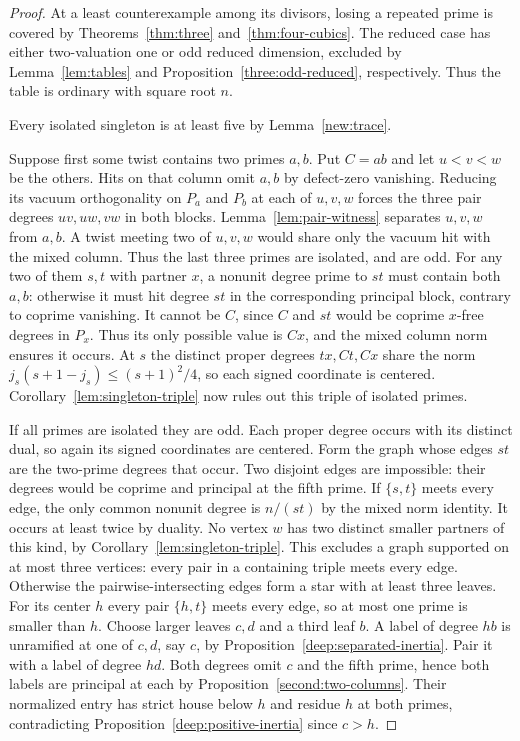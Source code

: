 \documentclass[11pt,a4paper]{article}
\numberwithin{equation}{section}
\theoremstyle{remark}
\begin{document}
\begin{proof}
At a least counterexample among its divisors, losing a repeated prime
is covered by Theorems~\ref{thm:three} and~\ref{thm:four-cubics}.
The reduced case has either two-valuation one or odd reduced
dimension, excluded by Lemma~\ref{lem:tables} and Proposition~\ref{three:odd-reduced}, respectively. Thus the table
is ordinary with square root $n$.

Every isolated singleton is at least five by Lemma~\ref{new:trace}.

Suppose first some twist contains two primes $a,b$. Put $C=ab$
and let $u<v<w$ be the others. Hits on that column omit $a,b$ by
defect-zero vanishing. Reducing its vacuum orthogonality on $P_a$
and $P_b$ at each of $u,v,w$ forces the three pair degrees $uv,uw,vw$
in both blocks. Lemma~\ref{lem:pair-witness} separates $u,v,w$ from
$a,b$. A twist meeting two of $u,v,w$ would share only the vacuum
hit with the mixed column. Thus the last three primes are isolated,
and are odd. For any two of them $s,t$ with partner $x$, a nonunit
degree prime to $st$ must contain both $a,b$: otherwise it must hit
degree $st$ in the corresponding principal block, contrary to coprime
vanishing. It cannot be $C$, since $C$ and $st$ would be coprime
$x$-free degrees in $P_x$. Thus its only possible value is $Cx$,
and the mixed column norm ensures it occurs. At $s$ the distinct proper degrees $tx,Ct,Cx$ share the
norm $j_s(s+1-j_s)\le(s+1)^2/4$, so each signed coordinate is
centered. Corollary~\ref{lem:singleton-triple} now rules out this
triple of isolated primes.

If all primes are isolated they are odd. Each proper degree occurs
with its distinct dual, so again its signed coordinates are centered.
Form the graph whose edges $st$ are the
two-prime degrees that occur. Two disjoint edges are impossible:
their degrees would be coprime and principal at the fifth prime.
If $\{s,t\}$ meets every edge, the only common nonunit degree is
$n/(st)$ by the mixed norm identity. It occurs at least twice by
duality. No vertex $w$ has two distinct smaller partners of this
kind, by Corollary~\ref{lem:singleton-triple}. This excludes a graph
supported on at most three vertices: every pair in a containing
triple meets every edge. Otherwise the pairwise-intersecting edges
form a star with at least three leaves. For its center $h$ every
pair $\{h,t\}$ meets every edge, so at most one prime is smaller
than $h$. Choose larger leaves $c,d$ and a third leaf $b$.
A label of degree $hb$ is unramified at one of $c,d$, say $c$,
by Proposition~\ref{deep:separated-inertia}. Pair it with a label of
degree $hd$. Both degrees omit $c$ and the fifth prime, hence both
labels are principal at each by Proposition~\ref{second:two-columns}.
Their normalized entry has strict house below $h$ and residue $h$
at both primes, contradicting Proposition~\ref{deep:positive-inertia}
since $c>h$.
\end{proof}
\end{document}
